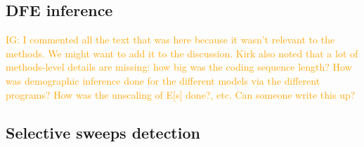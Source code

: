 \documentclass[hidelinks]{article}
\newcommand{\polydfe}{\texttt{polyDFE}\xspace}
\newcommand{\dadicli}{\texttt{dadi-cli}\xspace}
\newcommand{\grapes}{\texttt{GRAPES}\xspace}
\newcommand{\igcomment}[1]{\textcolor{orange}{IG: #1}}
\begin{document}
    \subsection*{DFE inference}
    \igcomment{I commented all the text that was here because it wasn't relevant to the methods. We might want to add it to the discussion.
    Kirk also noted that a lot of methods-level details are missing:
    how big was the coding sequence length?
    How was demographic inference done for the different models via the different programs?
    How was the unscaling of E[s] done?, etc.
    Can someone write this up?}

    \subsection*{Selective sweeps detection}
\end{document}
